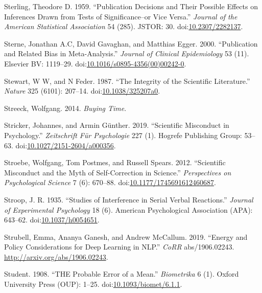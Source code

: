 \documentclass[a5paper]{book}
\begin{document}
\hypertarget{ref-doi:10.2307ux2f2282137}{}
Sterling, Theodore D. 1959. ``Publication Decisions and Their Possible
Effects on Inferences Drawn from Tests of Significance--or Vice Versa.''
\emph{Journal of the American Statistical Association} 54 (285). JSTOR:
30. doi:\href{https://doi.org/10.2307/2282137}{10.2307/2282137}.

\hypertarget{ref-doi:10.1016ux2fs0895-43560000242-0}{}
Sterne, Jonathan A.C, David Gavaghan, and Matthias Egger. 2000.
``Publication and Related Bias in Meta-Analysis.'' \emph{Journal of
Clinical Epidemiology} 53 (11). Elsevier BV: 1119--29.
doi:\href{https://doi.org/10.1016/s0895-4356(00)00242-0}{10.1016/s0895-4356(00)00242-0}.

\hypertarget{ref-doi:10.1038ux2f325207a0}{}
Stewart, W W, and N Feder. 1987. ``The Integrity of the Scientific
Literature.'' \emph{Nature} 325 (6101): 207--14.
doi:\href{https://doi.org/10.1038/325207a0}{10.1038/325207a0}.

\hypertarget{ref-isbn:9781781686195}{}
Streeck, Wolfgang. 2014. \emph{Buying Time}.

\hypertarget{ref-doi:10.1027ux2f2151-2604ux2fa000356}{}
Stricker, Johannes, and Armin Günther. 2019. ``Scientific Misconduct in
Psychology.'' \emph{Zeitschrift Für Psychologie} 227 (1). Hogrefe
Publishing Group: 53--63.
doi:\href{https://doi.org/10.1027/2151-2604/a000356}{10.1027/2151-2604/a000356}.

\hypertarget{ref-doi:10.1177ux2f1745691612460687}{}
Stroebe, Wolfgang, Tom Postmes, and Russell Spears. 2012. ``Scientific
Misconduct and the Myth of Self-Correction in Science.''
\emph{Perspectives on Psychological Science} 7 (6): 670--88.
doi:\href{https://doi.org/10.1177/1745691612460687}{10.1177/1745691612460687}.

\hypertarget{ref-doi:10.1037ux2fh0054651}{}
Stroop, J. R. 1935. ``Studies of Interference in Serial Verbal
Reactions.'' \emph{Journal of Experimental Psychology} 18 (6). American
Psychological Association (APA): 643--62.
doi:\href{https://doi.org/10.1037/h0054651}{10.1037/h0054651}.

\hypertarget{ref-DBLP:journalsux2fcorrux2fabs-1906-02243}{}
Strubell, Emma, Ananya Ganesh, and Andrew McCallum. 2019. ``Energy and
Policy Considerations for Deep Learning in NLP.'' \emph{CoRR}
abs/1906.02243. \url{http://arxiv.org/abs/1906.02243}.

\hypertarget{ref-doi:10.1093ux2fbiometux2f6.1.1}{}
Student. 1908. ``THE Probable Error of a Mean.'' \emph{Biometrika} 6
(1). Oxford University Press (OUP): 1--25.
doi:\href{https://doi.org/10.1093/biomet/6.1.1}{10.1093/biomet/6.1.1}.
\end{document}
